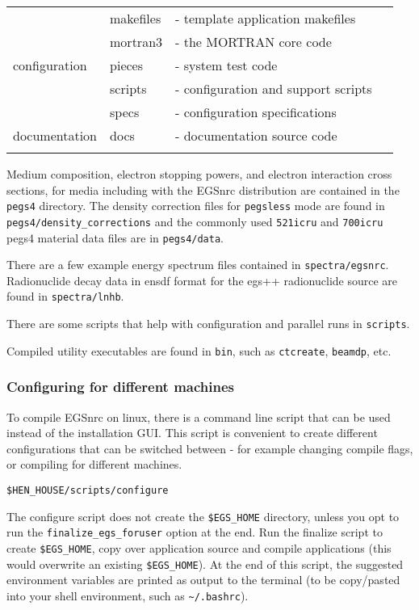 \documentclass[12pt,twoside]{article}
\begin{document}
\begin{table}[H]
\begin{center}
\begin{tabular}{|p{0.2\linewidth}|p{0.15\linewidth}|p{0.6\linewidth}|}
\multirow{5}{*}{configuration} & makefiles & - template application makefiles \\ \hhline{|~|-|-|}
    & mortran3 & - the MORTRAN core code \\ \hhline{|~|-|-|}
    & pieces & - system test code \\ \hhline{|~|-|-|}
    & scripts & - configuration and support scripts \\ \hhline{|~|-|-|}
    & specs & - configuration specifications \\ \hhline{|===|}

documentation & docs & - documentation source code \\ \hhline{|===|}


\end{tabular}
\end{center}
\end{table}

Medium composition, electron stopping powers, and electron interaction cross sections, for media including with the EGSnrc distribution are contained in the \Verb+pegs4+ directory. The density correction files for \Verb+pegsless+ mode are found in \Verb+pegs4/density_corrections+ and the commonly used \Verb+521icru+ and \Verb+700icru+ pegs4 material data files are in \Verb+pegs4/data+.

There are a few example energy spectrum files contained in \Verb+spectra/egsnrc+. Radionuclide decay data in ensdf format for the egs++ radionuclide source are found in \Verb+spectra/lnhb+.

There are some scripts that help with configuration and parallel runs in \Verb+scripts+.

Compiled utility executables are found in \Verb+bin+, such as \Verb+ctcreate+, \Verb+beamdp+, etc.

\subsubsection{Configuring for different machines}

To compile EGSnrc on linux, there is a command line script that can be used instead of the installation GUI. This script is convenient to create different configurations that can be switched between - for example changing compile flags, or compiling for different machines.

\Verb+$HEN_HOUSE/scripts/configure+

The configure script does not create the \Verb+$EGS_HOME+ directory, unless you opt to run the \Verb+finalize_egs_foruser+ option at the end. Run the finalize script to create \Verb+$EGS_HOME+, copy over application source and compile applications (this would overwrite an existing \Verb+$EGS_HOME+). At the end of this script, the suggested environment variables are printed as output to the terminal (to be copy/pasted into your shell environment, such as \Verb+~/.bashrc+).
\end{document}
